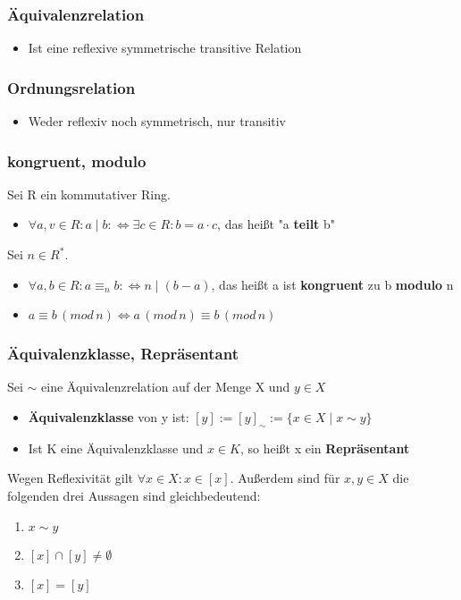\documentclass[titlepage]{article}
\newcommand{\1}{\mathbb{1}}
\newcommand{\0}{\mathbb{0}}
\begin{document}
				\subsubsection{Äquivalenzrelation}
					\begin{itemize}
						\item Ist eine reflexive symmetrische transitive Relation
					\end{itemize}
				\subsubsection{Ordnungsrelation}
					\begin{itemize}
						\item Weder reflexiv noch symmetrisch, nur transitiv
					\end{itemize}
				\subsubsection{kongruent, modulo}
					Sei R ein kommutativer Ring.
					\begin{itemize}
						\item $\forall a,v\in R:a\mid b:\Leftrightarrow \exists c\in R:b=a\cdot c$, das heißt "a \textbf{teilt} b"
					\end{itemize}
					Sei $n\in R^*$.
					\begin{itemize}
						\item $\forall a,b\in R:a\equiv_nb:\Leftrightarrow n\mid(b-a)$, das heißt a ist \textbf{kongruent} zu b \textbf{modulo} n
						\item $a\equiv b\,(mod\,n)\Leftrightarrow a\,(mod\,n)\equiv b\,(mod\,n)$
					\end{itemize}
				\subsubsection{Äquivalenzklasse, Repräsentant}
					Sei $\sim$ eine Äquivalenzrelation auf der Menge X und $y\in X$
					\begin{itemize}
						\item \textbf{Äquivalenzklasse} von y ist: $[y]:=[y]_\sim:=\{x\in X\mid x\sim y\}$
						\item Ist K eine Äquivalenzklasse und $x\in K$, so heißt x ein \textbf{Repräsentant}
					\end{itemize}
					Wegen Reflexivität gilt $\forall x\in X:x\in [x]$. Außerdem sind für $x,y\in X$ die folgenden drei Aussagen sind gleichbedeutend:
					\begin{enumerate}
						\item $x\sim y$
						\item $[x]\cap [y]\neq\emptyset$
						\item $[x]=[y]$
					\end{enumerate}
\end{document}
